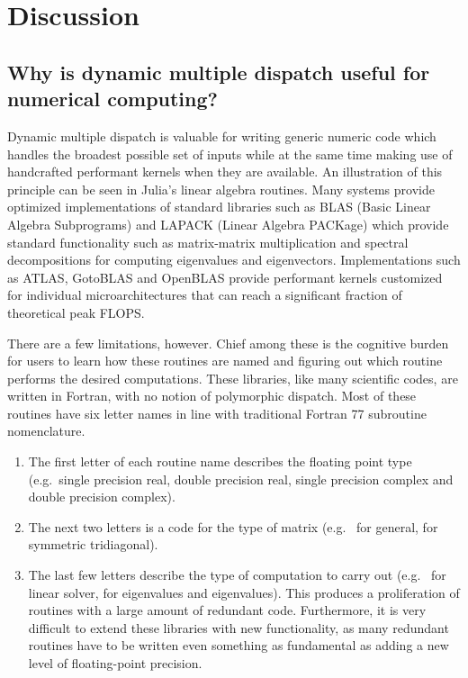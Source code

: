 \section{Discussion}

\subsection{Why is dynamic multiple dispatch useful for numerical computing?}

Dynamic multiple dispatch is valuable for writing generic numeric code which
handles the broadest possible set of inputs while at the same time making use
of handcrafted performant kernels when they are available. An illustration of
this principle can be seen in Julia's linear algebra routines. Many systems
provide optimized implementations of standard libraries such as BLAS (Basic
Linear Algebra Subprograms) and LAPACK (Linear Algebra PACKage) which provide
standard functionality such as matrix-matrix multiplication and spectral
decompositions for computing eigenvalues and eigenvectors. Implementations such
as ATLAS, GotoBLAS and OpenBLAS provide performant kernels customized for
individual microarchitectures that can reach a significant fraction of
theoretical peak FLOPS.

There are a few limitations, however. Chief among these is the cognitive burden
for users to learn how these routines are named and figuring out which routine
performs the desired computations. These libraries, like many scientific codes,
are written in Fortran, with no notion of polymorphic dispatch. Most of these
routines have six letter names in line with traditional Fortran 77 subroutine
nomenclature.

\begin{enumerate}

\item The first letter of each routine name describes the floating point type
(e.g.\ single precision real, double precision real, single precision complex
and double precision complex).

\item The next two letters is a code for the type of matrix (e.g.\  for
general,  for symmetric tridiagonal).

\item The last few letters describe the type of computation to carry out (e.g.\
 for linear solver,  for eigenvalues and eigenvalues). This
produces a proliferation of routines with a large amount of redundant code.
Furthermore, it is very difficult to extend these libraries with new
functionality, as many redundant routines have to be written even something as
fundamental as adding a new level of floating-point precision.

\end{enumerate}

